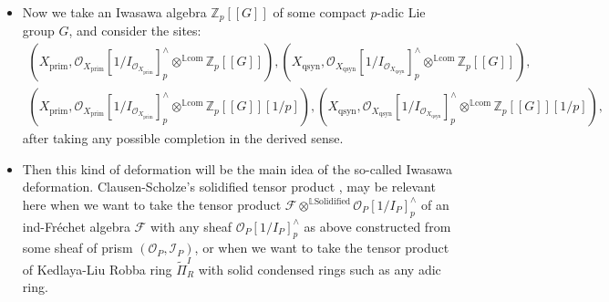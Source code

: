 \documentclass[11pt]{report}
\begin{document}
\begin{itemize}
\justifying
\item<5-> Now we take an Iwasawa algebra $\mathbb{Z}_p[[G]]$ of some compact $p$-adic Lie group $G$, and consider the sites:
\begin{align}
(X_{\mathrm{prim}},\mathcal{O}_{X_{\mathrm{prim}}}[1/I_{\mathcal{O}_{X_{\mathrm{prim}}}}]^\wedge_p{\otimes}^{\mathbb{L}\mathrm{com}}\mathbb{Z}_p[[G]]), (X_{\mathrm{qsyn}},\mathcal{O}_{X_{\mathrm{qsyn}}}[1/I_{\mathcal{O}_{X_{\mathrm{qsyn}}}}]^\wedge_p	{\otimes}^{\mathbb{L}\mathrm{com}}\mathbb{Z}_p[[G]]),\\
(X_{\mathrm{prim}},\mathcal{O}_{X_{\mathrm{prim}}}[1/I_{\mathcal{O}_{X_{\mathrm{prim}}}}]^\wedge_p{\otimes}^{\mathbb{L}\mathrm{com}}\mathbb{Z}_p[[G]][1/p]), (X_{\mathrm{qsyn}},\mathcal{O}_{X_{\mathrm{qsyn}}}[1/I_{\mathcal{O}_{X_{\mathrm{qsyn}}}}]^\wedge_p	{\otimes}^{\mathbb{L}\mathrm{com}}\mathbb{Z}_p[[G]][1/p]),
\end{align}
after taking any possible completion in the derived sense.
\item<6-> Then this kind of deformation will be the main idea of the so-called Iwasawa deformation. Clausen-Scholze's solidified tensor product \cite{CS1}, \cite{CS2} may be relevant here when we want to take the tensor product $\mathcal{F}{\otimes^{\mathbb{L}\mathrm{Solidified}}}\mathcal{O}_P[1/I_P]^\wedge_p$ of an ind-Fr\'echet algebra $\mathcal{F}$ with any sheaf $\mathcal{O}_P[1/I_P]^\wedge_p$ as above constructed from some sheaf of prism $(\mathcal{O}_P,\mathcal{I}_P)$, or when we want to take the tensor product of Kedlaya-Liu Robba ring $\widetilde{\Pi}_R^I$ with solid condensed rings such as any adic ring.	
\end{itemize}
	






\newpage
\end{document}
